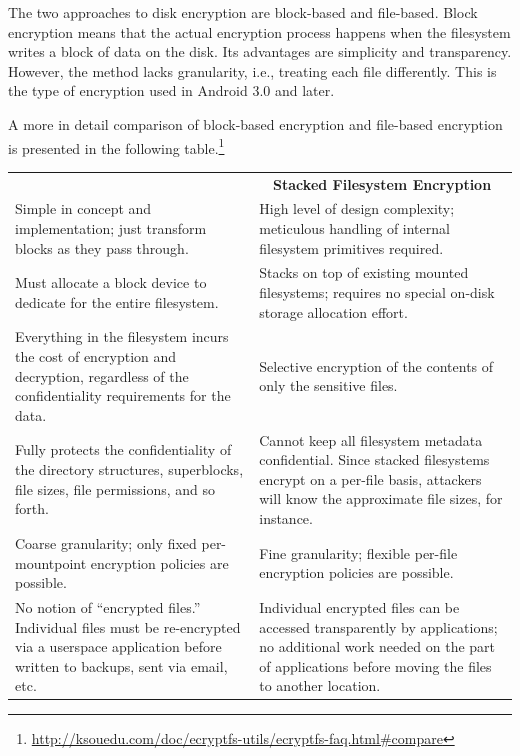 The two approaches to disk encryption are block-based and file-based. Block encryption means that the actual encryption process happens when the filesystem writes a block of data on the disk. Its advantages are simplicity and transparency. However, the method lacks granularity, i.e., treating each file differently. This is the type of encryption used in Android 3.0 and later.

A more in detail comparison of block-based encryption and file-based encryption is presented in the following table.\footnote{\url{http://ksouedu.com/doc/ecryptfs-utils/ecryptfs-faq.html\#compare}}

\renewcommand{\arraystretch}{1.8}
\begin{center}
\begin{table}[tp]
	\begin{tabularx}{\textwidth}{|| m{} || m{} ||}
		\hhline{|t:=:t:=:t|}
		\multicolumn{1}{||c||}{\textbf{Block Device Encryption}} & 
			\multicolumn{1}{c||}{\textbf{Stacked Filesystem Encryption}} \\ 
		\hhline{|:=::=:|}
		Simple in concept and implementation; just transform blocks as they pass through. & High level of design complexity; meticulous handling of internal filesystem primitives required. \\
		\hhline{|:=::=:|}
		Must allocate a block device to dedicate for the entire filesystem. & Stacks on top of existing mounted filesystems; requires no special on-disk storage allocation effort. \\
		\hhline{|:=::=:|}
		Everything in the filesystem incurs the cost of encryption and decryption, regardless of the confidentiality requirements for the data. & Selective encryption of the contents of only the sensitive files. \\
		\hhline{|:=::=:|}
		Fully protects the confidentiality of the directory structures, superblocks, file sizes, file permissions, and so forth. & Cannot keep all filesystem metadata confidential. Since stacked filesystems encrypt on a per-file basis, attackers will know the approximate file sizes, for instance. \\
		\hhline{|:=::=:|}
		Coarse granularity; only fixed per-mountpoint encryption policies are possible. & Fine granularity; flexible per-file encryption policies are possible. \\
		\hhline{|:=::=:|}		
		No notion of ``encrypted files.'' Individual files must be re-encrypted via a userspace application before written to backups, sent via email, etc. & Individual encrypted files can be accessed transparently by applications; no additional work needed on the part of applications before moving the files to another location. \\

\end{tabularx}
\end{table}
\end{center}

